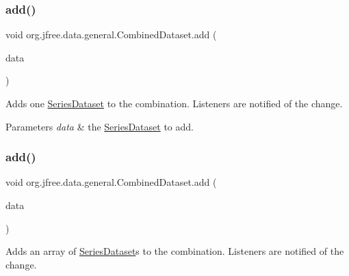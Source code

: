 \subsubsection{\texorpdfstring{add()}{add()}\hspace{0.1cm}{\footnotesize\ttfamily [1/3]}}
{\footnotesize\ttfamily void org.\+jfree.\+data.\+general.\+Combined\+Dataset.\+add (\begin{DoxyParamCaption}\item[{\mbox{\hyperlink{interfaceorg_1_1jfree_1_1data_1_1general_1_1_series_dataset}{Series\+Dataset}}}]{data }\end{DoxyParamCaption})}

Adds one \mbox{\hyperlink{interfaceorg_1_1jfree_1_1data_1_1general_1_1_series_dataset}{Series\+Dataset}} to the combination. Listeners are notified of the change.


\begin{DoxyParams}{Parameters}
{\em data} & the \mbox{\hyperlink{interfaceorg_1_1jfree_1_1data_1_1general_1_1_series_dataset}{Series\+Dataset}} to add. \\
\hline
\end{DoxyParams}
\mbox{\label{classorg_1_1jfree_1_1data_1_1general_1_1_combined_dataset_a96821dfe0654378d89f9448e9676fcfa}} 
\subsubsection{\texorpdfstring{add()}{add()}\hspace{0.1cm}{\footnotesize\ttfamily [2/3]}}
{\footnotesize\ttfamily void org.\+jfree.\+data.\+general.\+Combined\+Dataset.\+add (\begin{DoxyParamCaption}\item[{\mbox{\hyperlink{interfaceorg_1_1jfree_1_1data_1_1general_1_1_series_dataset}{Series\+Dataset}} \mbox{[}$\,$\mbox{]}}]{data }\end{DoxyParamCaption})}

Adds an array of \mbox{\hyperlink{interfaceorg_1_1jfree_1_1data_1_1general_1_1_series_dataset}{Series\+Dataset}}\textquotesingle{}s to the combination. Listeners are notified of the change.


